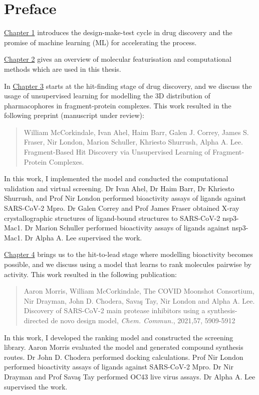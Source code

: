 \chapter*{Preface}
\hyperref[ch:intro]{Chapter 1} introduces the design-make-test cycle in drug discovery and the promise of machine learning (ML) for accelerating the process.

\hyperref[ch:background]{Chapter 2} gives an overview of molecular featurisation and computational methods which are used in this thesis.

In \hyperref[ch:fresco]{Chapter 3} starts at the hit-finding stage of drug discovery, and we discuss the usage of unsupervised learning for modelling the 3D distribution of pharmacophores in fragment-protein complexes. This work resulted in the following preprint (manuscript under review):
\begin{quote}
William McCorkindale, Ivan Ahel, Haim Barr, Galen J. Correy, James S. Fraser, Nir London, Marion Schuller, Khriesto Shurrush, Alpha A. Lee. Fragment-Based Hit Discovery via Unsupervised Learning of Fragment-Protein Complexes.
\end{quote}
In this work, I implemented the model and conducted the computational validation and virtual screening. Dr Ivan Ahel, Dr Haim Barr, Dr Khriesto Shurrush, and Prof Nir London performed bioactivity assays of ligands against SARS-CoV-2 Mpro. Dr Galen Correy and Prof James Fraser obtained X-ray crystallographic structures of ligand-bound structures to SARS-CoV-2 nsp3-Mac1. Dr Marion Schuller performed bioactivity assays of ligands against nsp3-Mac1. Dr Alpha A. Lee supervised the work.

\hyperref[ch:ranking]{Chapter 4} brings us to the hit-to-lead stage where modelling bioactivity becomes possible, and we discuss using a model that learns to rank molecules pairwise by activity. This work resulted in the following publication:
\begin{quote}
Aaron Morris, William McCorkindale, The COVID Moonshot Consortium, Nir Drayman, John D. Chodera, Savaş Tay, Nir London and Alpha A. Lee. Discovery of SARS-CoV-2 main protease inhibitors using a synthesis-directed de novo design model, \textit{Chem. Commun.}, 2021,57, 5909-5912 
\end{quote}
In this work, I developed the ranking model and constructed the screening library. Aaron Morris evaluated the model and generated compound synthesis routes. Dr John D. Chodera performed docking calculations. Prof Nir London performed bioactivity assays of ligands against SARS-CoV-2 Mpro. Dr Nir Drayman and Prof Savaş Tay performed OC43 live virus assays.  Dr Alpha A. Lee supervised the work.

